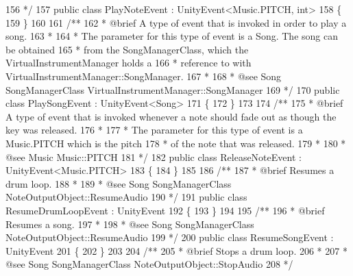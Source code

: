 \begin{DoxyCodeInclude}
156 \textcolor{comment}{    */}
157     \textcolor{keyword}{public} \textcolor{keyword}{class }PlayNoteEvent : UnityEvent<Music.PITCH, int>
158     \{
159     \}
160 \textcolor{comment}{}
161 \textcolor{comment}{    /** }
162 \textcolor{comment}{     * @brief A type of event that is invoked in order to play a song.}
163 \textcolor{comment}{     * }
164 \textcolor{comment}{     * The parameter for this type of event is a Song. The song can be obtained}
165 \textcolor{comment}{     * from the SongManagerClass, which the VirtualInstrumentManager holds a}
166 \textcolor{comment}{     * reference to with VirtualInstrumentManager::SongManager.}
167 \textcolor{comment}{     *  }
168 \textcolor{comment}{     * @see Song SongManagerClass VirtualInstrumentManager::SongManager}
169 \textcolor{comment}{    */}
170     \textcolor{keyword}{public} \textcolor{keyword}{class }PlaySongEvent : UnityEvent<Song>
171     \{
172     \}
173 \textcolor{comment}{}
174 \textcolor{comment}{    /** }
175 \textcolor{comment}{     * @brief A type of event that is invoked whenever a note should fade out as though the key was
       released. }
176 \textcolor{comment}{     * }
177 \textcolor{comment}{     * The parameter for this type of event is a Music.PITCH which is the pitch}
178 \textcolor{comment}{     * of the note that was released.}
179 \textcolor{comment}{     * }
180 \textcolor{comment}{     * @see Music Music::PITCH}
181 \textcolor{comment}{    */}
182     \textcolor{keyword}{public} \textcolor{keyword}{class }ReleaseNoteEvent : UnityEvent<Music.PITCH>
183     \{
184     \}
185 \textcolor{comment}{}
186 \textcolor{comment}{    /** }
187 \textcolor{comment}{     * @brief Resumes a drum loop.}
188 \textcolor{comment}{     * }
189 \textcolor{comment}{     * @see Song SongManagerClass NoteOutputObject::ResumeAudio}
190 \textcolor{comment}{    */}
191     \textcolor{keyword}{public} \textcolor{keyword}{class }ResumeDrumLoopEvent : UnityEvent
192     \{
193     \}
194 \textcolor{comment}{}
195 \textcolor{comment}{    /** }
196 \textcolor{comment}{     * @brief Resumes a song.}
197 \textcolor{comment}{     * }
198 \textcolor{comment}{     * @see Song SongManagerClass NoteOutputObject::ResumeAudio}
199 \textcolor{comment}{    */}
200     \textcolor{keyword}{public} \textcolor{keyword}{class }ResumeSongEvent : UnityEvent
201     \{
202     \}
203 \textcolor{comment}{}
204 \textcolor{comment}{    /** }
205 \textcolor{comment}{     * @brief Stops a drum loop.}
206 \textcolor{comment}{     * }
207 \textcolor{comment}{     * @see Song SongManagerClass NoteOutputObject::StopAudio}
208 \textcolor{comment}{    */}

\end{DoxyCodeInclude}
